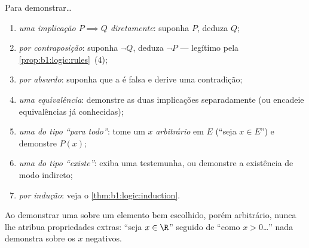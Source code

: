 \begin{method}\label{met:b1:logic:proofs}
Para demonstrar\dots
\begin{enumerate}
  \item \emph{uma implicação $P \implies Q$ diretamente}: suponha $P$,
        deduza $Q$;
  \item \emph{por contraposição}: suponha $\lnot Q$, deduza $\lnot P$
        --- legítimo pela \cref{prop:b1:logic:rules}~(4);
  \item \emph{por absurdo}: suponha que a  é falsa e derive
        uma contradição;
  \item \emph{uma equivalência}: demonstre as duas implicações
        separadamente (ou encadeie equivalências já conhecidas);
  \item \emph{uma  do tipo ``para todo''}: tome um $x$
        \emph{arbitrário} em $E$ (``seja $x \in E$'') e demonstre $P(x)$;
  \item \emph{uma  do tipo ``existe''}: exiba uma testemunha, ou
        demonstre a existência de modo indireto;
  \item \emph{por indução}: veja o \cref{thm:b1:logic:induction}.
\end{enumerate}
Ao demonstrar uma  sobre um elemento bem escolhido, porém
arbitrário, nunca lhe atribua propriedades extras: ``seja $x \in \R$''
seguido de ``como $x > 0$\dots'' nada demonstra sobre os $x$ negativos.
\end{method}

